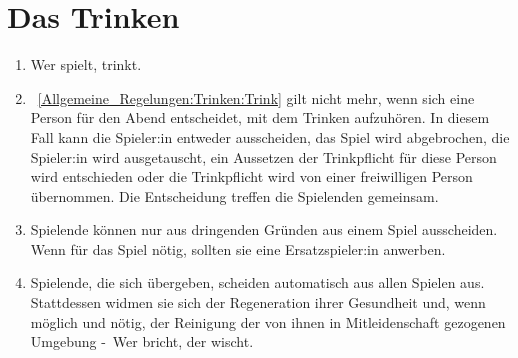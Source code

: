 \section{Das Trinken}
\begin{enumerate}[label={(\arabic*)}]
	\item\label{Allgemeine_Regelungen:Trinken:Trink}
	Wer spielt, trinkt.
	
	\item
~\ref{Allgemeine_Regelungen:Trinken:Trink} gilt nicht mehr, wenn sich eine Person für den Abend entscheidet, mit dem Trinken aufzuhören.
	In diesem Fall kann die Spieler:in entweder ausscheiden, das Spiel wird abgebrochen, die Spieler:in wird ausgetauscht,
	ein Aussetzen der Trinkpflicht für diese Person wird entschieden oder die Trinkpflicht wird von einer freiwilligen Person übernommen.
	Die Entscheidung treffen die Spielenden gemeinsam.
	
	\item
	Spielende können nur aus dringenden Gründen aus einem Spiel ausscheiden.
	Wenn für das Spiel nötig, sollten sie eine Ersatzspieler:in anwerben.
	
	\item
	Spielende, die sich übergeben, scheiden automatisch aus allen Spielen aus.
	Stattdessen widmen sie sich der Regeneration ihrer Gesundheit und, wenn möglich und nötig, der Reinigung der von ihnen in Mitleidenschaft gezogenen Umgebung -~\glqq{}Wer bricht, der wischt\grqq{}.
\end{enumerate}

